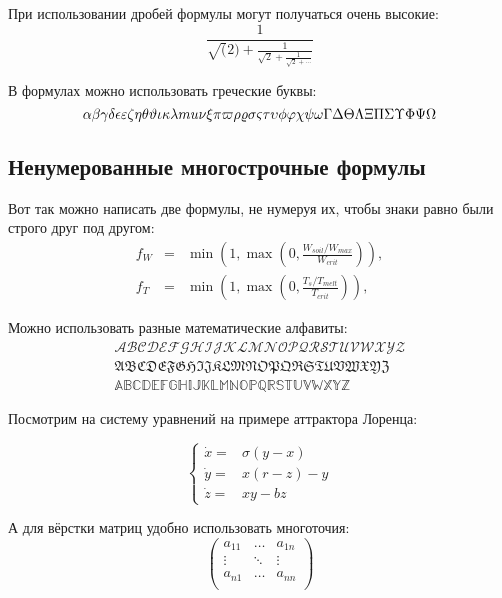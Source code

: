 При использовании дробей формулы могут получаться очень высокие:
$$
  \frac{1}{\sqrt(2)+
  \displaystyle\frac{1}{\sqrt{2}+
  \displaystyle\frac{1}{\sqrt{2}+\cdots}}}
$$

В формулах можно использовать греческие буквы:
$$
\alpha\beta\gamma\delta\epsilon\varepsilon\zeta\eta\theta\vartheta\iota\kappa\lambda\\mu\nu\xi\pi\varpi\rho\varrho\sigma\varsigma\tau\upsilon\phi\varphi\chi\psi\omega\Gamma\Delta\Theta\Lambda\Xi\Pi\Sigma\Upsilon\Phi\Psi\Omega
$$


\subsection{Ненумерованные многострочные формулы} \label{subsect1_3_2}

Вот так можно написать две формулы, не нумеруя их, чтобы знаки равно были строго друг под другом:
\begin{eqnarray}
  f_W & = & \min \left( 1, \max \left( 0, \frac{W_{soil} / W_{max}}{W_{crit}} \right)  \right), \nonumber \\
  f_T & = & \min \left( 1, \max \left( 0, \frac{T_s / T_{melt}}{T_{crit}} \right)  \right), \nonumber
\end{eqnarray}

Можно использовать разные математические алфавиты:
\begin{eqnarray}
\mathcal{ABCDEFGHIJKLMNOPQRSTUVWXYZ} \nonumber \\
\mathfrak{ABCDEFGHIJKLMNOPQRSTUVWXYZ} \nonumber \\
\mathbb{ABCDEFGHIJKLMNOPQRSTUVWXYZ} \nonumber
\end{eqnarray}

Посмотрим на систему уравнений на примере аттрактора Лоренца:

$$
\left\{
  \begin{array}{rl}
    \dot x = & \sigma (y-x) \\
    \dot y = & x (r - z) - y \\
    \dot z = & xy - bz
  \end{array}
\right.
$$

А для вёрстки матриц удобно использовать многоточия:
$$
\left(
  \begin{array}{ccc}
  	a_{11} & \ldots & a_{1n} \\
  	\vdots & \ddots & \vdots \\
  	a_{n1} & \ldots & a_{nn} \\
  \end{array}
\right)
$$


